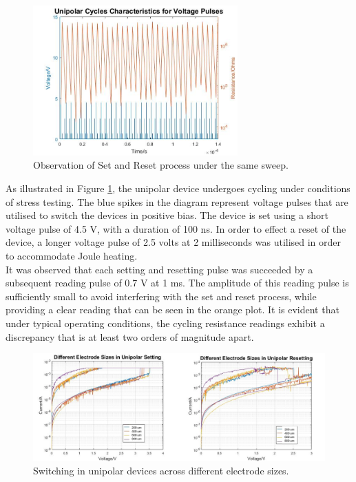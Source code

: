 \begin{figure}[htbp!] 
    \centering    
    \includegraphics[width=0.7\textwidth]{Chapter3/Figs/j.png}
    \caption[Observation of Set and Reset process under the same sweep.]{Observation of Set and Reset process under the same sweep.}
    \label{fig:3j}
\end{figure}

\noindent As illustrated in Figure \ref{fig:3j}, the unipolar device undergoes cycling under conditions of stress testing. The blue spikes in the diagram represent voltage pulses that are utilised to switch the devices in positive bias. The device is set using a short voltage pulse of 4.5 V, with a duration of 100 ns. In order to effect a reset of the device, a longer voltage pulse of 2.5 volts at 2 milliseconds was utilised in order to accommodate Joule heating. \\

\noindent It was observed that each setting and resetting pulse was succeeded by a subsequent reading pulse of 0.7 V at 1 ms. The amplitude of this reading pulse is sufficiently small to avoid interfering with the set and reset process, while providing a clear reading that can be seen in the orange plot. It is evident that under typical operating conditions, the cycling resistance readings exhibit a discrepancy that is at least two orders of magnitude apart.\\

\begin{figure}[htbp!] 
    \centering    
    \includegraphics[width=1\textwidth]{Chapter3/Figs/k.png}
    \caption[Switching in unipolar devices across different electrode sizes.]{Switching in unipolar devices across different electrode sizes.}
    \label{fig:3k}
\end{figure}

